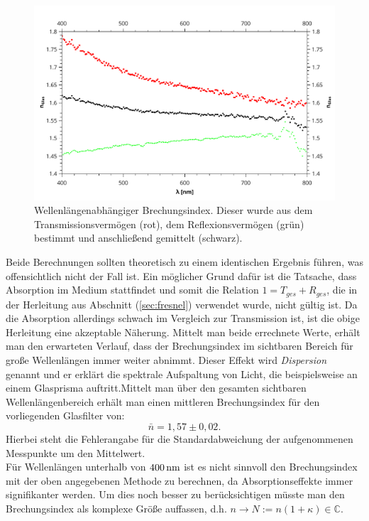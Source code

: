 	\begin{figure} [ht]
				\centering
				\includegraphics[width=\linewidth]{pic/n_glas.pdf}
				\caption{Wellenlängenabhängiger Brechungsindex. Dieser wurde aus dem Transmissionsvermögen (rot), dem Reflexionsvermögen (grün) bestimmt und anschließend gemittelt (schwarz).}
				\label{fig:n_glas}
	\end{figure} 
	Beide Berechnungen sollten theoretisch zu einem identischen Ergebnis führen, was offensichtlich nicht der Fall ist. Ein möglicher Grund dafür ist die Tatsache, dass Absorption im Medium stattfindet und somit die Relation $1 = T_{ges} + R_{ges}$, die in der Herleitung aus Abschnitt (\ref{sec:fresnel}) verwendet wurde, nicht gültig ist. Da die Absorption allerdings schwach im Vergleich zur Transmission ist, ist die obige Herleitung eine akzeptable Näherung. Mittelt man beide errechnete Werte, erhält man den erwarteten Verlauf, dass der Brechungsindex im sichtbaren Bereich für große Wellenlängen immer weiter abnimmt. Dieser Effekt wird \textit{Dispersion} genannt und er erklärt die spektrale Aufspaltung von Licht, die beispielsweise an einem Glasprisma auftritt.Mittelt man über den gesamten sichtbaren Wellenlängenbereich erhält man einen mittleren Brechungsindex für den vorliegenden Glasfilter von:
	\begin{equation}
		\bar{n} = 1,57 \pm 0,02.
	\end{equation}
	Hierbei steht die Fehlerangabe für die Standardabweichung der aufgenommenen Messpunkte um den Mittelwert.\\
	Für Wellenlängen unterhalb  von $\unit[400]{nm}$ ist es nicht sinnvoll den Brechungsindex mit der oben angegebenen Methode zu berechnen, da Absorptionseffekte immer signifikanter werden. Um dies noch besser zu berücksichtigen müsste man den Brechungsindex als komplexe Größe auffassen, d.h. $n \rightarrow N := n(1 + \kappa) \in \mathbb{C}$.
	